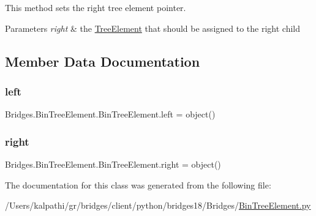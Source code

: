 This method sets the right tree element pointer. 


\begin{DoxyParams}{Parameters}
{\em right} & the \mbox{\hyperlink{namespace_bridges_1_1_tree_element}{Tree\+Element}} that should be assigned to the right child \\
\hline
\end{DoxyParams}


\subsection{Member Data Documentation}
\mbox{\label{class_bridges_1_1_bin_tree_element_1_1_bin_tree_element_ae2011efda691620e8c76e366131b0195}} 
\subsubsection{\texorpdfstring{left}{left}}
{\footnotesize\ttfamily Bridges.\+Bin\+Tree\+Element.\+Bin\+Tree\+Element.\+left = object()\hspace{0.3cm}{\ttfamily [static]}}

\mbox{\label{class_bridges_1_1_bin_tree_element_1_1_bin_tree_element_a5130987f56eff4edcc8c8ef323f8cd3d}} 
\subsubsection{\texorpdfstring{right}{right}}
{\footnotesize\ttfamily Bridges.\+Bin\+Tree\+Element.\+Bin\+Tree\+Element.\+right = object()\hspace{0.3cm}{\ttfamily [static]}}



The documentation for this class was generated from the following file\+:\begin{DoxyCompactItemize}
\item 
/\+Users/kalpathi/gr/bridges/client/python/bridges18/\+Bridges/\mbox{\hyperlink{_bin_tree_element_8py}{Bin\+Tree\+Element.\+py}}\end{DoxyCompactItemize}

